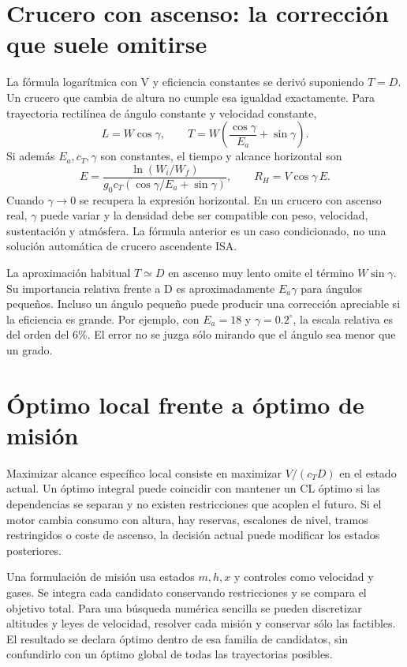 \section{Crucero con ascenso: la corrección que suele omitirse}
La fórmula logarítmica con V y eficiencia constantes se derivó suponiendo $T=D$. Un crucero que cambia de altura no cumple esa igualdad exactamente. Para trayectoria rectilínea de ángulo constante y velocidad constante,
\begin{equation}
L=W\cos\gamma,\qquad
T=W\left(\frac{\cos\gamma}{E_a}+\sin\gamma\right).
\end{equation}
Si además $E_a,c_T,\gamma$ son constantes, el tiempo y alcance horizontal son
\begin{equation}
E=\frac{\ln(W_i/W_f)}{g_0c_T(\cos\gamma/E_a+\sin\gamma)},\qquad
R_H=V\cos\gamma\,E.
\end{equation}
Cuando $\gamma\to0$ se recupera la expresión horizontal. En un crucero con ascenso real, $\gamma$ puede variar y la densidad debe ser compatible con peso, velocidad, sustentación y atmósfera. La fórmula anterior es un caso condicionado, no una solución automática de crucero ascendente ISA.

La aproximación habitual $T\simeq D$ en ascenso muy lento omite el término $W\sin\gamma$. Su importancia relativa frente a D es aproximadamente $E_a\gamma$ para ángulos pequeños. Incluso un ángulo pequeño puede producir una corrección apreciable si la eficiencia es grande. Por ejemplo, con $E_a=18$ y $\gamma=0.2^\circ$, la escala relativa es del orden del 6\%. El error no se juzga sólo mirando que el ángulo sea menor que un grado.

\section{Óptimo local frente a óptimo de misión}
Maximizar alcance específico local consiste en maximizar $V/(c_TD)$ en el estado actual. Un óptimo integral puede coincidir con mantener un CL óptimo si las dependencias se separan y no existen restricciones que acoplen el futuro. Si el motor cambia consumo con altura, hay reservas, escalones de nivel, tramos restringidos o coste de ascenso, la decisión actual puede modificar los estados posteriores.

Una formulación de misión usa estados $m,h,x$ y controles como velocidad y gases. Se integra cada candidato conservando restricciones y se compara el objetivo total. Para una búsqueda numérica sencilla se pueden discretizar altitudes y leyes de velocidad, resolver cada misión y conservar sólo las factibles. El resultado se declara óptimo dentro de esa familia de candidatos, sin confundirlo con un óptimo global de todas las trayectorias posibles.

